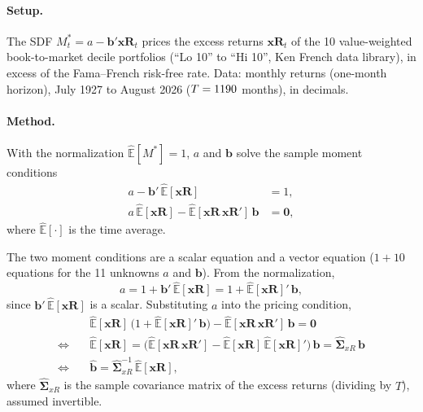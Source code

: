 \documentclass[11pt]{article}
\begin{document}
\paragraph{Setup.}
The SDF $M^*_t = a - \mathbf{b}'\mathbf{xR}_t$ prices the excess returns $\mathbf{xR}_t$ of the 10
value-weighted book-to-market decile portfolios (``Lo 10'' to ``Hi 10'', Ken French data library), in
excess of the Fama--French risk-free rate. Data: monthly returns (one-month horizon), July 1927 to August
2026 ($T = 1190$ months), in decimals.

\paragraph{Method.}
With the normalization $\widehat{\mathbb{E}}[M^*] = 1$, $a$ and $\mathbf{b}$ solve the sample moment
conditions
\begin{align*}
  a - \mathbf{b}'\,\widehat{\mathbb{E}}[\mathbf{xR}] &= 1, \\
  a\,\widehat{\mathbb{E}}[\mathbf{xR}] - \widehat{\mathbb{E}}[\mathbf{xR}\,\mathbf{xR}']\,\mathbf{b} &= \mathbf{0},
\end{align*}
where $\widehat{\mathbb{E}}[\cdot]$ is the time average.

The two moment conditions are a scalar equation and a vector equation ($1 + 10$ equations for the 11 unknowns
$a$ and $\mathbf{b}$). From the normalization,
\[
  a = 1 + \mathbf{b}'\,\widehat{\mathbb{E}}[\mathbf{xR}] = 1 + \widehat{\mathbb{E}}[\mathbf{xR}]'\,\mathbf{b},
\]
since $\mathbf{b}'\,\widehat{\mathbb{E}}[\mathbf{xR}]$ is a scalar. Substituting $a$ into the pricing
condition,
\begin{align*}
  & \widehat{\mathbb{E}}[\mathbf{xR}]\,\big(1 + \widehat{\mathbb{E}}[\mathbf{xR}]'\,\mathbf{b}\big)
    - \widehat{\mathbb{E}}[\mathbf{xR}\,\mathbf{xR}']\,\mathbf{b} = \mathbf{0} \\
  \Longleftrightarrow\quad
  & \widehat{\mathbb{E}}[\mathbf{xR}]
    = \big(\widehat{\mathbb{E}}[\mathbf{xR}\,\mathbf{xR}'] - \widehat{\mathbb{E}}[\mathbf{xR}]\,\widehat{\mathbb{E}}[\mathbf{xR}]'\big)\,\mathbf{b}
    = \hat{\bm{\Sigma}}_{xR}\,\mathbf{b} \\
  \Longleftrightarrow\quad
  & \hat{\mathbf{b}} = \hat{\bm{\Sigma}}_{xR}^{-1}\,\widehat{\mathbb{E}}[\mathbf{xR}],
\end{align*}
where $\hat{\bm{\Sigma}}_{xR}$ is the sample covariance matrix of the excess returns (dividing by $T$), assumed
invertible.
\end{document}
